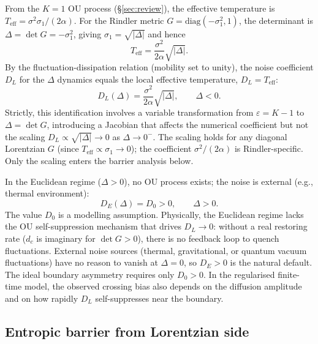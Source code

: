 \documentclass[11pt,a4paper]{article}
\theoremstyle{definition}
\begin{document}
From the $K{=}1$ OU process (\S\ref{sec:review}), the effective temperature is $T_{\mathrm{eff}} = \sigma^2\sigma_1/(2\alpha)$. For the Rindler metric $G = \mathrm{diag}(-\sigma_1^2, 1)$, the determinant is $\Delta = \det G = -\sigma_1^2$, giving $\sigma_1 = \sqrt{|\Delta|}$ and hence
\[
T_{\mathrm{eff}} = \frac{\sigma^2}{2\alpha}\sqrt{|\Delta|}.
\]
By the fluctuation-dissipation relation (mobility set to unity), the noise coefficient $D_L$ for the $\Delta$ dynamics equals the local effective temperature, $D_L = T_{\mathrm{eff}}$:
\begin{equation}
D_L(\Delta) = \frac{\sigma^2}{2\alpha}\sqrt{|\Delta|}, \qquad \Delta < 0.
\label{eq:D_Lor}
\end{equation}
Strictly, this identification involves a variable transformation from $\varepsilon = K - 1$ to $\Delta = \det G$, introducing a Jacobian that affects the numerical coefficient but not the scaling $D_L \propto \sqrt{|\Delta|} \to 0$ as $\Delta \to 0^-$. The scaling holds for any diagonal Lorentzian $G$ (since $T_{\mathrm{eff}} \propto \sigma_1 \to 0$); the coefficient $\sigma^2/(2\alpha)$ is Rindler-specific. Only the scaling enters the barrier analysis below.

In the Euclidean regime ($\Delta > 0$), no OU process exists; the noise is external (e.g., thermal environment):
\begin{equation}
D_E(\Delta) = D_0 > 0, \qquad \Delta > 0.
\label{eq:D_Euc}
\end{equation}
The value $D_0$ is a modelling assumption. Physically, the Euclidean regime lacks the OU self-suppression mechanism that drives $D_L \to 0$: without a real restoring rate ($d_c$ is imaginary for $\det G > 0$), there is no feedback loop to quench fluctuations. External noise sources (thermal, gravitational, or quantum vacuum fluctuations) have no reason to vanish at $\Delta = 0$, so $D_E > 0$ is the natural default. The ideal boundary asymmetry requires only $D_0 > 0$. In the regularised finite-time model, the observed crossing bias also depends on the diffusion amplitude and on how rapidly $D_L$ self-suppresses near the boundary.

\subsection{Entropic barrier from Lorentzian side}
\end{document}
